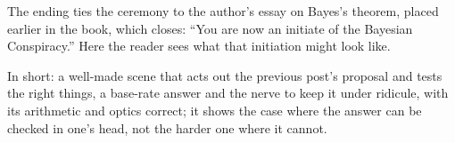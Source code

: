 \begin{afterword}
The ending ties the ceremony to the author's essay on Bayes's theorem, placed earlier in the book, which closes: ``You are now an initiate of the Bayesian Conspiracy.'' Here the reader sees what that initiation might look like.

In short: a well-made scene that acts out the previous post's proposal and tests the right things, a base-rate answer and the nerve to keep it under ridicule, with its arithmetic and optics correct; it shows the case where the answer can be checked in one's head, not the harder one where it cannot.
\end{afterword}
